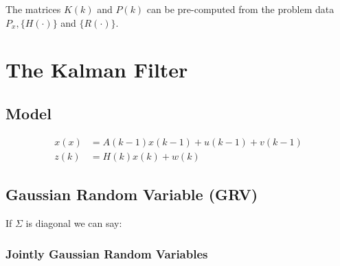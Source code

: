 \documentclass[10pt,a4paper]{scrartcl}
\begin{document}
\begin{multicols*}{2}
\begin{multicols*}{3}
The matrices $K(k)$ and $P(k)$ can be pre-computed from the problem data $P_x, \{H(\cdot)\}$ and $\{R(\cdot)\}$.

\section{The Kalman Filter}

\subsection{Model}

\begin{align*}
x(x)&=A(k-1)x(k-1)+u(k-1)+v(k-1)\\
z(k)&=H(k)x(k)+w(k)
\end{align*}


\subsection{Gaussian Random Variable (GRV)}



If $\Sigma$ is diagonal we can say:


\subsubsection{Jointly Gaussian Random Variables}


\end{multicols*}
\end{multicols*}
\end{document}
